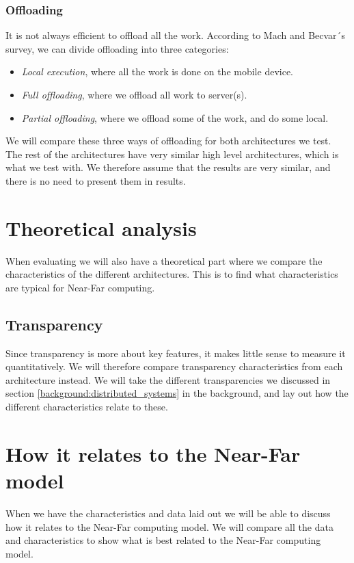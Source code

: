 \subsubsection{Offloading}
It is not always efficient to offload all the work. According to Mach and Becvar´s survey\cite{mach_mobile_2017}, we can divide offloading into three categories:
\begin{itemize}
    \item \textit{Local execution}, where all the work is done on the mobile device.
    \item \textit{Full offloading}, where we offload all work to server(s).
    \item \textit{Partial offloading}, where we offload some of the work, and do some local.
\end{itemize}
We will compare these three ways of offloading for both architectures we test.
The rest of the architectures have very similar high level architectures, which is what we test with. We therefore assume that the results are very similar, and there is no need to present them in results.













\section{Theoretical analysis}
When evaluating we will also have a theoretical part where we compare the characteristics of the different architectures. This is to find what characteristics are typical for Near-Far computing.

\subsection{Transparency}
Since transparency is more about key features, it makes little sense to measure it quantitatively. We will therefore compare transparency characteristics from each architecture instead. We will take the different transparencies we discussed in section \ref{background:distributed_systems} in the background, and lay out how the different characteristics relate to these.




\section{How it relates to the Near-Far model}
When we have the characteristics and data laid out we will be able to discuss how it relates to the Near-Far computing model. We will compare all the data and characteristics to show what is best related to the Near-Far computing model.









